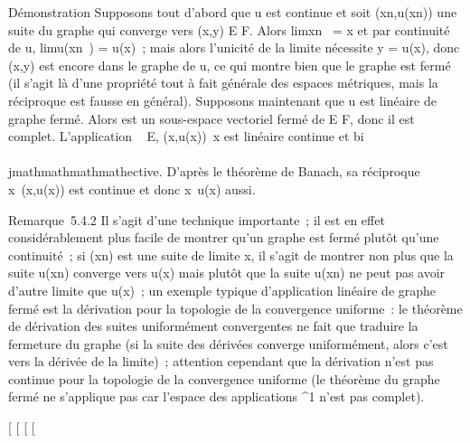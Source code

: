 Démonstration Supposons tout d'abord que u est continue et soit
(xn,u(xn)) une suite du graphe qui converge vers
(x,y) \in E \times F. Alors limxn~ = x et
par continuité de u, limu(xn~) =
u(x)~; mais alors l'unicité de la limite nécessite y = u(x), donc (x,y)
est encore dans le graphe de u, ce qui montre bien que le graphe est
fermé (il s'agit là d'une propriété tout à fait générale des espaces
métriques, mais la réciproque est fausse en général). Supposons
maintenant que u est linéaire de graphe \Gamma fermé. Alors \Gamma est un
sous-espace vectoriel fermé de E \times F, donc il est complet. L'application
\Gamma \rightarrow~ E, (x,u(x))\mapsto~x est linéaire continue et
bi\\\\jmathmathmathmathective. D'après le théorème de Banach, sa réciproque
x\mapsto~(x,u(x)) est continue et donc
x\mapsto~u(x) aussi.

Remarque~5.4.2 Il s'agit d'une technique importante~; il est en effet
considérablement plus facile de montrer qu'un graphe est fermé plutôt
qu'une continuité~; si (xn) est une suite de limite x, il
s'agit de montrer non plus que la suite u(xn) converge vers
u(x) mais plutôt que la suite u(xn) ne peut pas avoir d'autre
limite que u(x)~; un exemple typique d'application linéaire de graphe
fermé est la dérivation pour la topologie de la convergence uniforme~:
le théorème de dérivation des suites uniformément convergentes ne fait
que traduire la fermeture du graphe (si la suite des dérivées converge
uniformément, alors c'est vers la dérivée de la limite)~; attention
cependant que la dérivation n'est pas continue pour la topologie de la
convergence uniforme (le théorème du graphe fermé ne s'applique pas car
l'espace des applications ^1 n'est pas complet).

{[}
{[}
{[}
{[}
